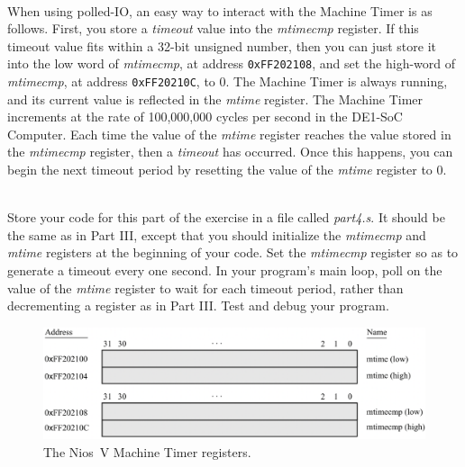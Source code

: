 \documentclass[epsfig,10pt,fullpage]{article}
\newcommand{\CommonDocsPath}{../../../../common/docs}
\begin{document}
~\\
\noindent
When using polled-IO, an easy way to interact with the Machine Timer is as follows. First, you
store a {\it timeout} value into the {\it mtimecmp} register. If this timeout value fits 
within a 32-bit unsigned number, then you can just store it into the low word of {\it mtimecmp}, 
at address \texttt{0xFF202108}, and set the high-word of {\it mtimecmp}, at 
address \texttt{0xFF20210C}, to 0. The Machine Timer is always running, and its 
current value is reflected in the {\it mtime} register. The Machine Timer increments at
the rate of 100,000,000 cycles per second in the DE1-SoC Computer. Each time the
value of the {\it mtime} register reaches the value stored in the {\it mtimecmp} register, 
then a {\it timeout} has occurred. Once this happens, you can begin the next timeout period 
by resetting the value of the {\it mtime} register to 0.

~\\
\noindent
Store your code for this part of the exercise in a file called {\it part4.s}. It should be
the same as in Part III, except that you should initialize the {\it mtimecmp} and {\it
mtime} registers at the beginning of your code. Set the {\it mtimecmp} register so as
to generate a timeout every one second. 
In your program's main loop, poll on the value of the {\it mtime} register to wait for each 
timeout period, rather than decrementing a register as in Part III. Test and debug
your program.

\begin{figure}[htb]
	\begin{center}
	\includegraphics[scale=.40]{figures/figuretimer.png}
	\end{center}
	\caption{The Nios~V Machine Timer registers.}
\label{fig:timer}
\end{figure}


\end{document}
